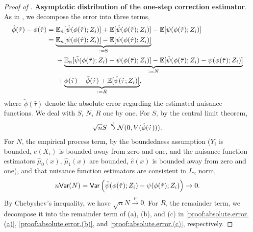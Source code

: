 \begin{proof}[Proof of ]
    \noindent \textbf{Asymptotic distribution of the one-step correction estimator}.
    As in \cite{kennedy2022semiparametric}, we decompose the error into three terms,
    \begin{align*}
    \hat{\phi}(\hat{\tau}) - {\phi}(\hat{\tau})
        &= \mathbb{E}_n[\hat{\psi}(\phi(\hat{\tau}); Z_i)] + \mathbb{E}[\hat{\psi}(\phi(\hat{\tau}); Z_i)] - \mathbb{E}[{\psi}(\phi(\hat{\tau}); Z_i)] \\
        &= \underbrace{\mathbb{E}_n[{\psi}(\phi(\hat{\tau}); Z_i)] - \mathbb{E}[{\psi}(\phi(\hat{\tau}); Z_i)]}_{:=\text{S}}  \\
        &\quad~+ \underbrace{\mathbb{E}_n[\hat{\psi}(\phi(\hat{\tau}); Z_i) - {\psi}(\phi(\hat{\tau}); Z_i)] - \mathbb{E}[\hat{\psi}(\phi(\hat{\tau}); Z_i) - {\psi}(\phi(\hat{\tau}); Z_i)]}_{:=N} \\
        &\quad~+\underbrace{{\phi}(\hat{\tau}) - \tilde{\phi}(\hat{\tau}) + \mathbb{E}[\hat{\psi}(\hat{\tau}; Z_i)]}_{:=R},
    \end{align*}
    where $\tilde{\phi}(\hat{\tau})$ denote the absolute error regarding the estimated nuisance functions.
    We deal with $S$, $N$, $R$ one by one.
    For $S$, by the central limit theorem, 
    \begin{align}\label{proof:absolute.error.S}
        \begin{split}
            \sqrt{n} S \stackrel{d}{\to} \mathcal{N}(0, V(\hat{\phi}(\hat{\tau}))).
        \end{split}
    \end{align}
    For $N$, the empirical process term, by the boundedness assumption ($Y_i$ is bounded, $e(X_i)$ is bounded away from zero and one, and the nuisance function estimators $\hat{\mu}_0(x)$, $\hat{\mu}_1(x)$ are bounded, $\hat{e}(x)$ is bounded away from zero and one), and that nuisance function estimators are consistent in $L_2$ norm, 
    \begin{align}\label{proof:absolute.error.N}
        n \mathsf{Var}(N)
        = \mathsf{Var}\left(\hat{\psi}(\phi(\hat{\tau}); Z_i) - {\psi}(\phi(\hat{\tau}); Z_i)\right)
        \to 0.
    \end{align}
    By Chebyshev's inequality, we have $\sqrt{n}N \stackrel{p}{\to} 0$.
    For $R$, the remainder term, we decompose it into the remainder term of (a), (b), and (c) in \eqref{proof:absolute.error.(a)}, \eqref{proof:absolute.error.(b)}, and \eqref{proof:absolute.error.(c)}, respectively.

\end{proof}
